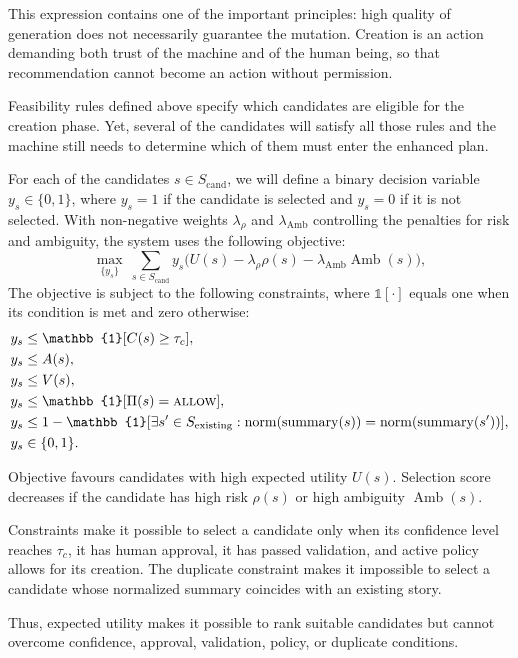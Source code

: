\documentclass[manuscript,review]{acmart}
\begin{document}
This expression contains one of the important principles: high quality of generation does not necessarily guarantee the mutation. Creation is an action demanding both trust of the machine and of the human being, so that recommendation cannot become an action without permission.

Feasibility rules defined above specify which candidates are eligible for the creation phase. Yet, several of the candidates will satisfy all those rules and the machine still needs to determine which of them must enter the enhanced plan.

For each of the candidates $s\in S_{\text{cand}}$, we will define a binary decision variable $y_s\in\{0,1\}$, where $y_s=1$ if the candidate is selected and $y_s=0$ if it is not selected. With non-negative weights $\lambda_\rho$ and $\lambda_{\mathrm{Amb}}$ controlling the penalties for risk and ambiguity, the system uses the following objective:
\begin{equation}
	\max_{\{y_s\}} ~ \sum_{s \in S_{\text{cand}}} y_s
	\Big(
	U(s)-\lambda_\rho\rho(s)
	-\lambda_{\mathrm{Amb}}\operatorname{Amb}(s)
	\Big),
\end{equation}
The objective is subject to the following constraints, where $\mathbb{1}[\cdot]$ equals one when its condition is met and zero otherwise:
\begin{align}
	y_s &\leq \mathbb{1}[C(s)\ge \tau_c], \\
	y_s &\leq A(s), \\
	y_s &\leq V(s), \\
	y_s &\leq \mathbb{1}[\Pi(s)=\textsc{allow}], \\
	y_s &\leq 1-\mathbb{1}[\exists s'\in S_{\text{existing}}:
	\operatorname{norm}(\operatorname{summary}(s))
	=
	\operatorname{norm}(\operatorname{summary}(s'))], \\
	y_s &\in \{0,1\}.
\end{align}

Objective favours candidates with high expected utility $U(s)$. Selection score decreases if the candidate has high risk $\rho(s)$ or high ambiguity $\operatorname{Amb}(s)$.

Constraints make it possible to select a candidate only when its confidence level reaches $\tau_c$, it has human approval, it has passed validation, and active policy allows for its creation. The duplicate constraint makes it impossible to select a candidate whose normalized summary coincides with an existing story.

Thus, expected utility makes it possible to rank suitable candidates but cannot overcome confidence, approval, validation, policy, or duplicate conditions.
\end{document}

